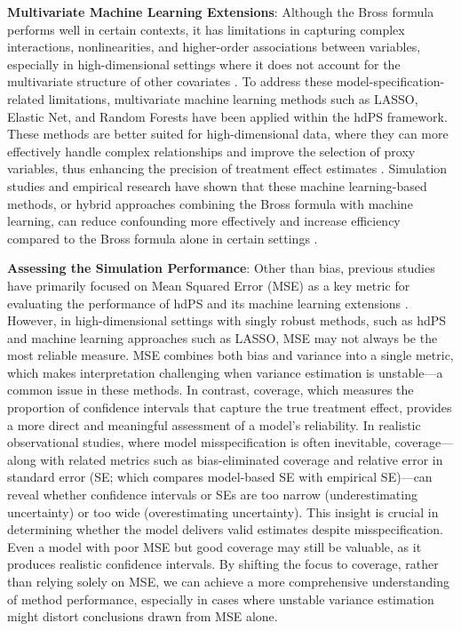 \documentclass[sn-vancouver,Numbered,lineno,pdflatex]{sn-jnl}
\begin{document}
\textbf{Multivariate Machine Learning Extensions}: Although the Bross
formula performs well in certain contexts, it has limitations in
capturing complex interactions, nonlinearities, and higher-order
associations between variables, especially in high-dimensional settings
where it does not account for the multivariate structure of other
covariates \citep{karim2024high, karim2018can}. To address these
model-specification-related limitations, multivariate machine learning
methods such as LASSO, Elastic Net, and Random Forests have been applied
within the hdPS framework. These methods are better suited for
high-dimensional data, where they can more effectively handle complex
relationships and improve the selection of proxy variables, thus
enhancing the precision of treatment effect estimates
\citep{karim2018can, schneeweiss2017variable, franklin2015regularized}.
Simulation studies and empirical research have shown that these machine
learning-based methods, or hybrid approaches combining the Bross formula
with machine learning, can reduce confounding more effectively and
increase efficiency compared to the Bross formula alone in certain
settings
\citep{karim2018can, schneeweiss2017variable, franklin2015regularized}.

\textbf{Assessing the Simulation Performance}: Other than bias, previous
studies have primarily focused on Mean Squared Error (MSE) as a key
metric for evaluating the performance of hdPS and its machine learning
extensions
\citep{franklin2015regularized, pang2016effect, wyss2018using, karim2018can, simon2023evaluating}.
However, in high-dimensional settings with singly robust methods, such
as hdPS and machine learning approaches such as LASSO, MSE may not
always be the most reliable measure. MSE combines both bias and variance
into a single metric, which makes interpretation challenging when
variance estimation is unstable---a common issue in these methods. In
contrast, coverage, which measures the proportion of confidence
intervals that capture the true treatment effect, provides a more direct
and meaningful assessment of a model's reliability. In realistic
observational studies, where model misspecification is often inevitable,
coverage---along with related metrics such as bias-eliminated coverage
and relative error in standard error (SE; which compares model-based SE
with empirical SE)---can reveal whether confidence intervals or SEs are
too narrow (underestimating uncertainty) or too wide (overestimating
uncertainty). This insight is crucial in determining whether the model
delivers valid estimates despite misspecification. Even a model with
poor MSE but good coverage may still be valuable, as it produces
realistic confidence intervals. By shifting the focus to coverage,
rather than relying solely on MSE, we can achieve a more comprehensive
understanding of method performance, especially in cases where unstable
variance estimation might distort conclusions drawn from MSE alone.
\end{document}
